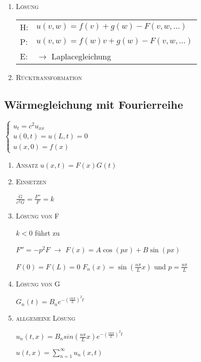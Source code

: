 \documentclass[10pt,a4paper]{scrartcl}
\begin{document}
\begin{multicols*}{3}
\begin{enumerate}
	\item \scshape{Lösung}
	
	\begin{tabular}{ll}
	\hline
	H:&		$u(v,w)=f(v)+g(w)-F(v,w,\dots)$\\
	P:&		$u(v,w)=f(w)v+g(w)-F(v,w,\dots)$\\
	E:&		$\rightarrow$ Laplacegleichung\\
	\hline
	\end{tabular}
	
	\item \scshape{Rücktransformation }
	
	\end{enumerate}
	
	\finn
	
	\subsection{Wärmegleichung mit Fourierreihe}
	
	\begin{center}
	$\begin{cases}
	u_t=c^2u_{xx}\\
	u(0,t)=u(L,t)=0\\
	u(x,0)=f(x)
	\end{cases}$
	\end{center}
	
	\begin{enumerate}
	\item \scshape{Ansatz} $u(x,t)=F(x)G(t)$
	\item \scshape{Einsetzen}

	$\frac{\dot{G}}{c^2G}=\frac{F''}{F}=k$
	
	\item \scshape{Lösung von F}
	
	$k<0$ führt zu
	
	$F''=-p^2F$ $\rightarrow$ $F(x)=A\cos(px)+B\sin(px)$
	
	$F(0)=F(L)=0$ \dahe $F_n(x)=\sin(\frac{n\pi}{L}x)$ und $p = \frac{n\pi}{L}$
	
	\item \scshape{Lösung von G}
	
	$G_n(t)=B_ne^{-(\frac{cn\pi}{L})^2t}$
	
	\item \scshape{allgemeine Lösung}
	
	$u_n(t,x) = B_nsin(\frac{n\pi}{L}x)e^{-(\frac{cn\pi}{L})^2t}$
	
	$u(t,x)=\sum_{n=1}^\infty{u_n(x,t)}$
	

\end{enumerate}
\end{multicols*}
\end{document}

